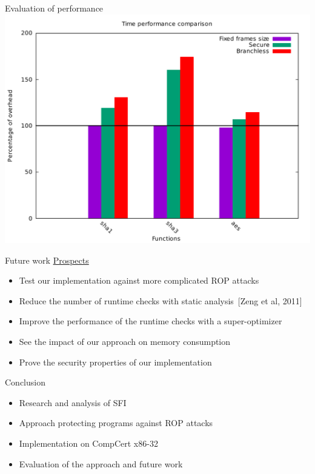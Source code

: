 \documentclass{beamer}
\begin{document}
\begin{frame}[c]{Evaluation of performance }
	\includegraphics[width=\textwidth]{images/percentage_focus.pdf}
\end{frame}


\begin{frame}[c]{Future work}
	\underline{Prospects}
	\begin{itemize}
		\item Test our implementation against more complicated ROP attacks
		\item Reduce the number of runtime checks with static analysis~[Zeng et al, 2011]
		\item Improve the performance of the runtime checks with a super-optimizer
		\item See the impact of our approach on memory consumption
		\item Prove the security properties of our implementation
	\end{itemize}
\end{frame}

\begin{frame}[c]{Conclusion}
	\begin{itemize}\itemsep16pt
		\item Research and analysis of SFI
		\item Approach protecting programs against ROP attacks
		\item Implementation on CompCert x86-32
		\item Evaluation of the approach and future work
	\end{itemize}
\end{frame}
\end{document}
